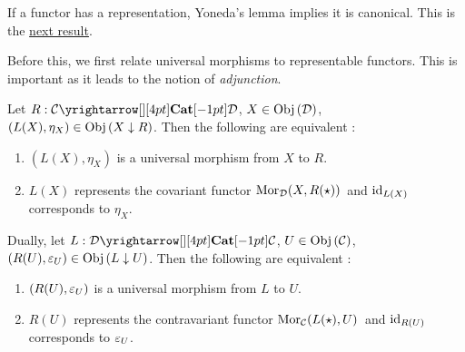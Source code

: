\begin{rmk}
  If a functor has a representation,
  Yoneda's lemma implies it is canonical.
  This is the \hyperlink{canonical_rep}{next result}. 

  Before this, we first relate universal morphisms to representable functors.
  This is important as it leads to the notion of \emph{adjunction}. 
\end{rmk}

\begin{prop}
  
  Let $R : \map{\CC}{\DD}{\CAT}{}$, $X \in \mathrm{Obj}\left(\mathcal{D}\right)$,
  $(L(X),\eta_X) \in \mathrm{Obj}\left(X\downarrow R\right)$. 
  Then the following are equivalent : 
  \begin{enumerate}
    \item $(L(X),\eta_X)$ is a universal morphism from $X$ to $R$.
    \item $L(X)$ represents the covariant functor $\mathrm{Mor}_{\mathcal{D}}(X, R(\star))\,$
    and $\mathrm{id}_{L(X)}$ corresponds to $\eta_X$. 
  \end{enumerate}

  Dually, let $L : \map{\DD}{\CC}{\CAT}{}$, $U \in \mathrm{Obj}\left(\mathcal{C}\right)$,
  $(R(U),\varepsilon_U) \in \mathrm{Obj}\left(L\downarrow U\right)$. 
  Then the following are equivalent : 
  \begin{enumerate}
    \item $(R(U),\varepsilon_U)$ is a universal morphism from $L$ to $U$.
    \item $R(U)$ represents the contravariant functor $\mathrm{Mor}_{\mathcal{C}}(L(\star), U)\,$
    and $\mathrm{id}_{R(U)}$ corresponds to $\varepsilon_U$.
  \end{enumerate}
\end{prop}
